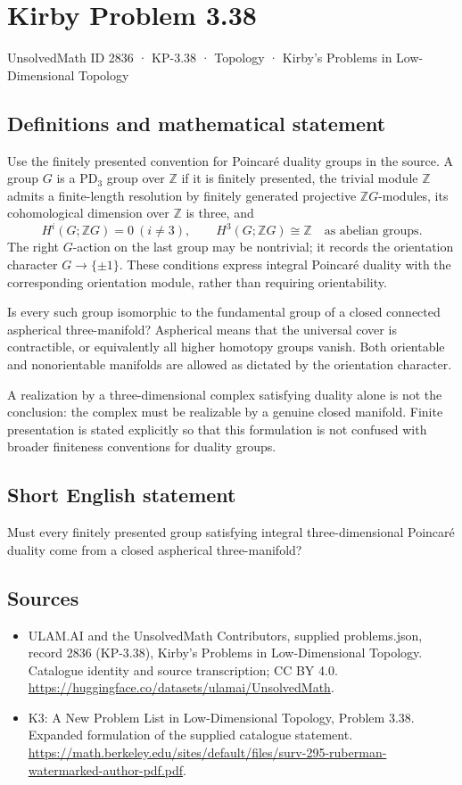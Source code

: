 \documentclass[11pt,a4paper]{article}
\begin{document}
\section*{Kirby Problem 3.38}\label{2836}
{\small UnsolvedMath ID 2836 · KP-3.38 · Topology · Kirby's Problems in Low-Dimensional Topology}
\subsection{Definitions and mathematical statement}
Use the finitely presented convention for Poincaré duality groups in the
source. A group $G$ is a $\mathrm{PD}_3$ group over $\mathbb Z$ if it is
finitely presented, the trivial module $\mathbb Z$ admits a finite-length
resolution by finitely generated projective $\mathbb ZG$-modules,
its cohomological dimension over $\mathbb Z$ is three, and
\[
 H^i(G;\mathbb ZG)=0\ (i\ne3),\qquad
 H^3(G;\mathbb ZG)\cong\mathbb Z
 \quad\text{as abelian groups}.
\]
The right $G$-action on the last group may be nontrivial; it records the
orientation character $G\to\{\pm1\}$. These conditions express integral
Poincaré duality with the corresponding orientation module, rather than
requiring orientability.

Is every such group isomorphic to the fundamental group of a closed
connected aspherical three-manifold? Aspherical means that the universal
cover is contractible, or equivalently all higher homotopy groups vanish.
Both orientable and nonorientable manifolds are allowed as dictated by the
orientation character.

A realization by a three-dimensional complex satisfying duality alone is
not the conclusion: the complex must be realizable by a genuine closed
manifold. Finite presentation is stated explicitly so that this formulation
is not confused with broader finiteness conventions for duality groups.
\subsection{Short English statement}
Must every finitely presented group satisfying integral three-dimensional Poincaré duality come from a closed aspherical three-manifold?
\subsection{Sources}
\begin{itemize}
\item[S1] ULAM.AI and the UnsolvedMath Contributors, supplied problems.json, record 2836 (KP-3.38), Kirby's Problems in Low-Dimensional Topology. Catalogue identity and source transcription; CC BY 4.0.
\url{https://huggingface.co/datasets/ulamai/UnsolvedMath}.
\item[S2] K3: A New Problem List in Low-Dimensional Topology, Problem 3.38. Expanded formulation of the supplied catalogue statement.
\url{https://math.berkeley.edu/sites/default/files/surv-295-ruberman-watermarked-author-pdf.pdf}.
\end{itemize}
\end{document}
